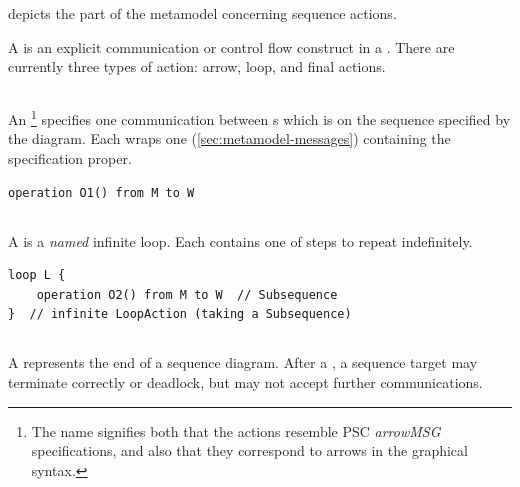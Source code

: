  depicts the part of the metamodel concerning
sequence actions.

A \msequenceaction{} is an explicit communication or control flow construct in a
\msubsequence.  There are currently three types of action: arrow, loop, and
final actions.

\subsection{\marrowaction}

An \marrowaction\footnote{The name signifies both that the actions resemble
PSC \emph{arrowMSG} specifications, and also that they correspond to arrows in
the graphical syntax.} specifies one communication between \mactor s which is on
the sequence specified by the diagram.  Each \marrowaction{} wraps one
\marrowmessagespec{} (\cref{sec:metamodel-messages})
containing the specification proper.

\begin{lstlisting}[style=Example]
operation O1() from M to W
\end{lstlisting}

\subsection{\mloopaction}

A \mloopaction{} is a \emph{named} infinite loop.    Each \mloopaction{} contains one
\msubsequence{} of steps to repeat indefinitely.

\begin{lstlisting}[style=Example]
loop L {
    operation O2() from M to W  // Subsequence
}  // infinite LoopAction (taking a Subsequence)
\end{lstlisting}

\subsection{\mfinalaction}

A \mfinalaction{} represents the end of a sequence diagram.  After a
\mfinalaction, a sequence target may terminate correctly or deadlock, but may
not accept further communications.


